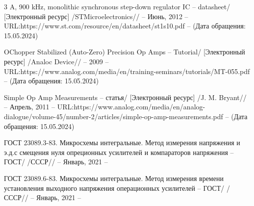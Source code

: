 \begin{thebibliography}{00}
 3 A, 900 kHz, monolithic synchronous step-down regulator IC
 -- datasheet/
  [Электронный ресурс]
 /STMicroelectronics// -- Июнь, 2012 -- 
 URL:https://www.st.com/resource/en/datasheet/st1s10.pdf --
 (Дата обращения: 15.05.2024)

 OChopper Stabilized (Auto-Zero) Precision Op Amps 
-- Tutorial/
[Электронный ресурс] /Analoc Device// --  2009 -- 
URL:https://www.analog.com/media/en/training-seminars/tutorials/MT-055.pdf
-- (Дата обращения: 15.05.2024)

 Simple Op Amp Measurements
-- статья/
[Электронный ресурс] /J. M. Bryant// -- Апрель, 2011 -- 
URL:https://www.analog.com/media/en/analog-dialogue/volume-45/number-2/articles/simple-op-amp-measurements.pdf
-- (Дата обращения: 15.05.2024)

 ГОСТ 23089.3-83. Микросхемы интегральные. Метод измерения напряжения и э.д.с 
смещения нуля опреционных усилителей и компараторов напряжения
-- ГОСТ/
 /СССР// -- Январь, 2021 -- 

 ГОСТ 23089.6-83. Микросхемы интегральные. Метод измерения времени установления выходного 
напряжения операционных усилителей 
-- ГОСТ/
 /СССР// -- Январь, 2021 -- 


\end{thebibliography}
